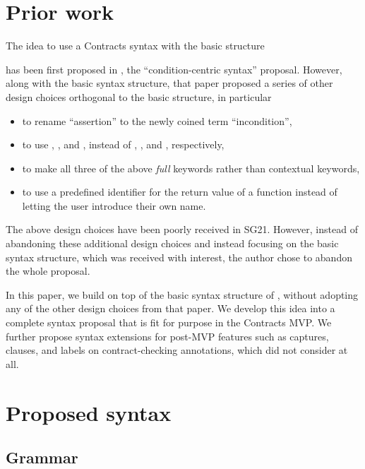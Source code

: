 \section{Prior work}

The idea to use a Contracts syntax with the basic structure

\phantom{~~~}

has been first proposed in \cite{P2737R0}, the ``condition-centric syntax'' proposal. However, along with the basic syntax structure, that paper proposed a series of other design choices orthogonal to the basic structure, in particular
\begin{itemize}
\item to rename ``assertion'' to the newly coined term ``incondition'',
\item to use , , and , instead of , , and , respectively,
\item to make all three of the above \emph{full} keywords rather than contextual keywords,
\item to use a predefined identifier  for the return value of a function instead of letting the user introduce their own name.
\end{itemize}

The above design choices have been poorly received in SG21. However, instead of abandoning these additional design choices and instead focusing on the basic syntax structure, which was received with interest, the author chose to abandon the whole proposal.

In this paper, we build on top of the basic syntax structure of \cite{P2737R0}, without adopting any of the other design choices from that paper. We develop this idea into a complete syntax proposal that is fit for purpose in the Contracts MVP. We further propose syntax extensions for post-MVP features such as captures,  clauses, and labels on contract-checking annotations, which \cite{P2737R0} did not consider at all.

\section{Proposed syntax}

\subsection{Grammar}

